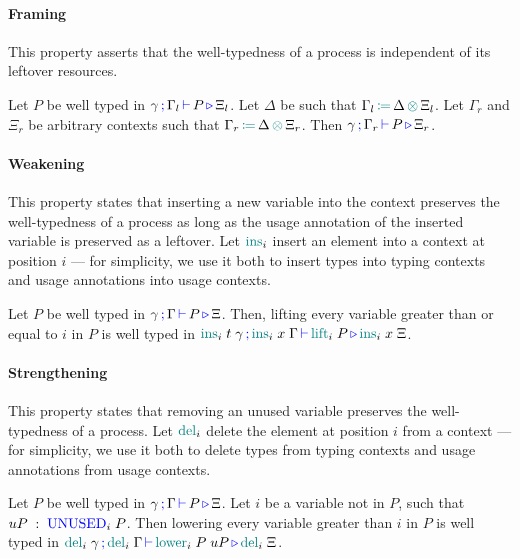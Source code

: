 \documentclass[]{llncs}
\newcommand{\type}[1]{\textcolor{blue}{\operatorname{#1}}}
\newcommand{\func}[1]{\textcolor{teal}{\operatorname{#1}}}
\newcommand{\opctx}[3]{#1 \, \func{\coloneqq} \, #2 \, \func{\otimes} \, #3}
\newcommand{\types}[4]{#1 \, \type{;} \, #2 \, \type{\vdash} \, #3 \, \type{\triangleright} \, #4}
\newcommand{\Unused}{\type{UNUSED}}
\begin{document}
\paragraph*{Framing}
This property asserts that the well-typedness of a process is independent of its leftover resources.

\begin{nitheorem}[Framing]
  \label{thm:framing}
  Let $P$ be well typed in $\types{\gamma}{\Gamma_l}{P}{\Xi_l}$.
  Let $\Delta$ be such that $\opctx{\Gamma_l}{\Delta}{\Xi_l}$.
  Let $\Gamma_r$ and $\Xi_r$ be arbitrary contexts such that $\opctx{\Gamma_r}{\Delta}{\Xi_r}$.
  Then $\types{\gamma}{\Gamma_r}{P}{\Xi_r}$.
\end{nitheorem}

\paragraph*{Weakening}
This property states that inserting a new variable into the context preserves the well-typedness of a process as long as the usage annotation of the inserted variable is preserved as a leftover.
Let $\func{ins}_i$ insert an element into a context at position $i$ --- for simplicity, we use it both to insert types into typing contexts and usage annotations into usage contexts.
\begin{nitheorem}[Weakening]
  \label{thm:weakening}
  Let $P$ be well typed in $\types{\gamma}{\Gamma}{P}{\Xi}$.
  Then, lifting every variable greater than or equal to $i$ in $P$ is well typed in
  $\types{\func{ins}_i \; t \; \gamma}{\func{ins}_i \; x \; \Gamma}{\func{lift}_i \; P}{\func{ins}_i \; x \; \Xi}$.
\end{nitheorem}

\paragraph*{Strengthening}
This property states that removing an unused variable preserves the well-typedness of a process.
Let $\func{del}_i$ delete the element at position $i$ from a context --- for simplicity, we use it both to delete types from typing contexts and usage annotations from usage contexts.
\begin{nitheorem}[Strengthening]
  \label{thm:strengthening} 
  Let $P$ be well typed in $\types{\gamma}{\Gamma}{P}{\Xi}$.
  Let $i$ be a variable not in $P$, such that $uP \; : \; \Unused_i \; P$.
  Then lowering every variable greater than $i$ in $P$ is well typed in $\types{\func{del}_i \; \gamma}{\func{del}_i \; \Gamma}{\func{lower}_i \; P \; uP}{\func{del}_i \; \Xi}$.
\end{nitheorem}
\end{document}
